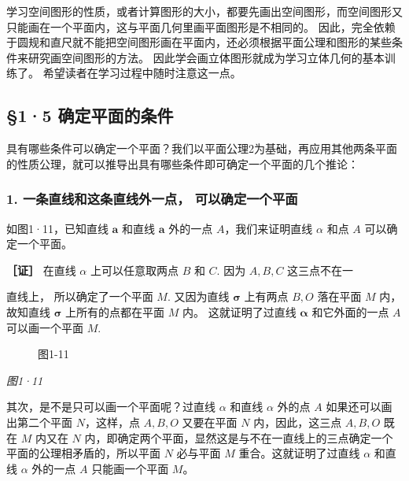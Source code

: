 学习空间图形的性质，或者计算图形的大小，都要先画出空间图形，而空间图形又只能画在一个平面内，这与平面几何里画平面图形是不相同的。
因此，完全依赖于圆规和直尺就不能把空间图形画在平面内，还必须根据平面公理和图形的某些条件来研究画空间图形的方法。
因此学会画立体图形就成为学习立体几何的基本训练了。
希望读者在学习过程中随时注意这一点。

\subsection{§1·5
确定平面的条件}

具有哪些条件可以确定一个平面？我们以平面公理2为基础，再应用其他两条平面的性质公理，就可以推导出具有哪些条件即可确定一个平面的几个推论：

\subsubsection{1. 一条直线和这条直线外一点，
可以确定一个平面}

如图1·11，已知直线 \(\pmb{a}\) 和直线 \(\pmb{a}\) 外的一点
\(A\)，我们来证明直线 \(\alpha\) 和点 \(A\) 可以确定一个平面。

\textbf{［证］} 在直线 \(\alpha\) 上可以任意取两点 \(B\) 和 \(C\). 因为
\(A, B, C\) 这三点不在一

直线上， 所以确定了一个平面 \(M\). 又因为直线 \(\pmb{\sigma}\) 上有两点
\(B, O\) 落在平面 \(M\) 内， 故知直线 \(\pmb{\sigma}\)
上所有的点都在平面 \(M\) 内。 这就证明了过直线 \(\pmb{\alpha}\)
和它外面的一点 \(A\) 可以画一个平面 \(M\).

\begin{figure}
\centering
{}
\caption{图1-11}
\end{figure}

\emph{图1·11}

其次，是不是只可以画一个平面呢？过直线 \(\alpha\) 和直线 \(\alpha\)
外的点 \(A\) 如果还可以画出第二个平面 \(N\)，这样，点 \(A, B, O\)
又要在平面 \(N\) 内，因此，这三点 \(A, B, O\) 既在 \(M\) 内又在 \(N\)
内，即确定两个平面，显然这是与不在一直线上的三点确定一个平面的公理相矛盾的，所以平面
\(N\) 必与平面 \(M\) 重合。这就证明了过直线 \(\alpha\) 和直线 \(\alpha\)
外的一点 \(A\) 只能画一个平面 \(M\)。

